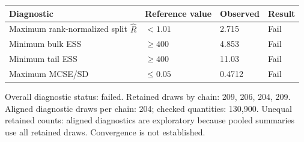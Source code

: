 \par\medskip\noindent
{\small
\begin{tabular}{@{}p{.38\linewidth}p{.18\linewidth}p{.18\linewidth}p{.14\linewidth}@{}}
\toprule
Diagnostic & Reference value & Observed & Result\\
\midrule
Maximum rank-normalized split $\widehat R$ & $< 1.01$ & 2.715 & Fail\\
Minimum bulk ESS & $\geq 400$ & 4.853 & Fail\\
Minimum tail ESS & $\geq 400$ & 11.03 & Fail\\
Maximum MCSE/SD & $\leq 0.05$ & 0.4712 & Fail\\
\bottomrule
\end{tabular}
}
\par\medskip
Overall diagnostic status: failed. Retained draws by chain: 209, 206, 204, 209. Aligned diagnostic draws per chain: 204; checked quantities: 130,900. Unequal retained counts: aligned diagnostics are exploratory because pooled summaries use all retained draws. Convergence is not established.\par
